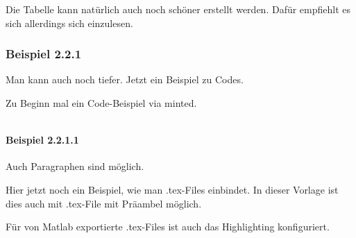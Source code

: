 Die Tabelle kann natürlich auch noch schöner erstellt werden. Dafür empfiehlt es sich allerdings sich einzulesen.

\subsubsection{Beispiel 2.2.1}

Man kann auch noch tiefer.
Jetzt ein Beispiel zu Codes.

Zu Beginn mal ein Code-Beispiel via minted.

\inputminted{systemverilog}{systemVerilogDemo.sv}

\paragraph{Beispiel 2.2.1.1}

Auch Paragraphen sind möglich.

Hier jetzt noch ein Beispiel, wie man .tex-Files einbindet.
In dieser Vorlage ist dies auch mit .tex-File mit Präambel möglich.



Für von Matlab exportierte .tex-Files ist auch das Highlighting konfiguriert.

\newpage                    %
